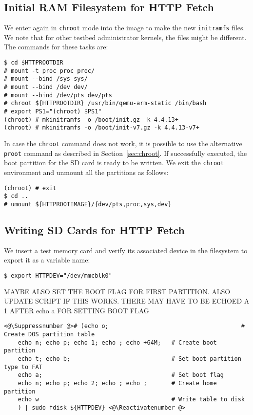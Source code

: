 \subsection{Initial RAM Filesystem for HTTP Fetch}
We enter again in \texttt{chroot} mode into the image to make the new
\texttt{initramfs} files. We note that for other testbed administrator
kernels, the files might be different. The commands for these tasks are:

\begin{lstlisting}[]
$ cd $HTTPROOTDIR
# mount -t proc proc proc/
# mount --bind /sys sys/
# mount --bind /dev dev/
# mount --bind /dev/pts dev/pts
# chroot ${HTTPROOTDIR} /usr/bin/qemu-arm-static /bin/bash
# export PS1="(chroot) $PS1"
(chroot) # mkinitramfs -o /boot/init.gz -k 4.4.13+
(chroot) # mkinitramfs -o /boot/init-v7.gz -k 4.4.13-v7+
\end{lstlisting}
\FloatBarrier
\vspace{-5mm}

In case the \texttt{chroot} command does not work, it is possible to use
the alternative \texttt{proot} command as described in
Section~\ref{sec:chroot}. If successfully executed, the boot partition for
the SD card is ready to be written. We exit the \texttt{chroot} environment
and unmount all the partitions as follows:

\begin{lstlisting}[]
(chroot) # exit
$ cd ..
# umount ${HTTPROOTIMAGE}/{dev/pts,proc,sys,dev}
\end{lstlisting}
\FloatBarrier
\vspace{-5mm}

\subsection{Writing SD Cards for HTTP Fetch}


We insert a test memory card and verify its associated device in the
filesystem to export it as a variable name:

\begin{lstlisting}[]
$ export HTTPDEV="/dev/mmcblk0"
\end{lstlisting}
\FloatBarrier
\vspace{-5mm}

MAYBE ALSO SET THE BOOT FLAG FOR FIRST PARTITION. ALSO UPDATE SCRIPT IF THIS
WORKS. THERE MAY HAVE TO BE ECHOED A 1 AFTER echo a FOR SETTING BOOT FLAG
\begin{lstlisting}[]
<@\Suppressnumber @># (echo o;                                      # Create DOS partition table
    echo n; echo p; echo 1; echo ; echo +64M;   # Create boot partition
    echo t; echo b;                             # Set boot partition type to FAT
    echo a;                                     # Set boot flag
    echo n; echo p; echo 2; echo ; echo ;       # Create home partition
    echo w                                      # Write table to disk
    ) | sudo fdisk ${HTTPDEV} <@\Reactivatenumber @>
\end{lstlisting}
\FloatBarrier
\vspace{-5mm}

